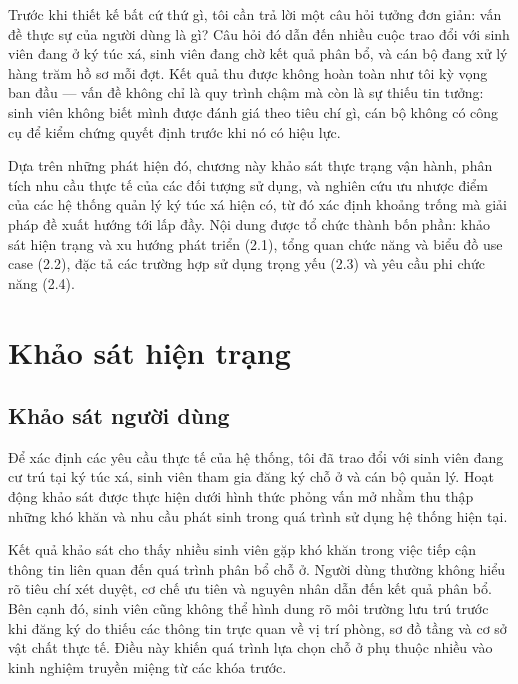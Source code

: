 \documentclass[../DoAn.tex]{subfiles}
\begin{document}
\sloppy

Trước khi thiết kế bất cứ thứ gì, tôi cần trả lời một câu hỏi tưởng đơn giản:
vấn đề thực sự của người dùng là gì? Câu hỏi đó dẫn đến nhiều cuộc trao đổi
với sinh viên đang ở ký túc xá, sinh viên đang chờ kết quả phân bổ, và cán bộ
đang xử lý hàng trăm hồ sơ mỗi đợt. Kết quả thu được không hoàn toàn như tôi
kỳ vọng ban đầu --- vấn đề không chỉ là quy trình chậm mà còn là sự thiếu
tin tưởng: sinh viên không biết mình được đánh giá theo tiêu chí gì, cán bộ
không có công cụ để kiểm chứng quyết định trước khi nó có hiệu lực.

Dựa trên những phát hiện đó, chương này khảo sát thực trạng vận hành, phân
tích nhu cầu thực tế của các đối tượng sử dụng, và nghiên cứu ưu nhược điểm
của các hệ thống quản lý ký túc xá hiện có, từ đó xác định khoảng trống mà
giải pháp đề xuất hướng tới lấp đầy. Nội dung được tổ chức thành bốn phần:
khảo sát hiện trạng và xu hướng phát triển (2.1), tổng quan chức năng và biểu
đồ use case (2.2), đặc tả các trường hợp sử dụng trọng yếu (2.3) và yêu cầu
phi chức năng (2.4).

\section{Khảo sát hiện trạng}
\label{sec:survey}

\subsection{Khảo sát người dùng}

Để xác định các yêu cầu thực tế của hệ thống, tôi đã trao đổi với sinh viên đang
cư trú tại ký túc xá, sinh viên tham gia đăng ký chỗ ở và cán bộ quản lý. Hoạt
động khảo sát được thực hiện dưới hình thức phỏng vấn mở nhằm thu thập những
khó khăn và nhu cầu phát sinh trong quá trình sử dụng hệ thống hiện tại.

Kết quả khảo sát cho thấy nhiều sinh viên gặp khó khăn trong việc tiếp cận thông
tin liên quan đến quá trình phân bổ chỗ ở. Người dùng thường không hiểu rõ tiêu
chí xét duyệt, cơ chế ưu tiên và nguyên nhân dẫn đến kết quả phân bổ. Bên cạnh
đó, sinh viên cũng không thể hình dung rõ môi trường lưu trú trước khi đăng ký
do thiếu các thông tin trực quan về vị trí phòng, sơ đồ tầng và cơ sở vật chất
thực tế. Điều này khiến quá trình lựa chọn chỗ ở phụ thuộc nhiều vào kinh
nghiệm truyền miệng từ các khóa trước.
\end{document}
